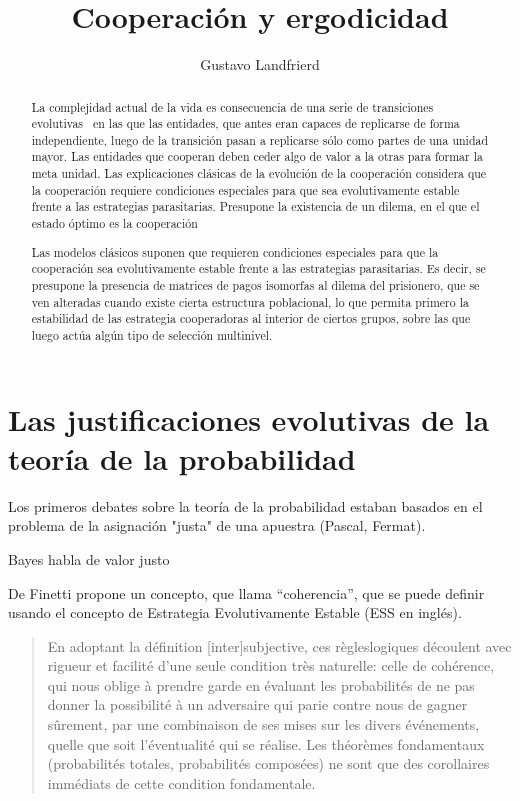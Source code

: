 \documentclass[a4paper,10pt]{article}
\title{Cooperación y ergodicidad}
\author{Gustavo Landfrierd}
\begin{document}
\maketitle

\begin{abstract}

La complejidad actual de la vida es consecuencia de una serie de transiciones evolutivas~\cite{maynardSmith1995-majorTransitions} en las que las entidades, que antes eran capaces de replicarse de forma independiente, luego de la transición pasan a replicarse sólo como partes de una unidad mayor.
Las entidades que cooperan deben ceder algo de valor a la otras para formar la meta unidad.
Las explicaciones clásicas de la evolución de la cooperación considera que la cooperación requiere condiciones especiales para que sea evolutivamente estable frente a las estrategias parasitarias.
Presupone la existencia de un dilema, en el que el estado óptimo es la cooperación


Las modelos clásicos suponen que 
requieren condiciones especiales para que la cooperación sea evolutivamente estable frente a las estrategias parasitarias.
Es decir, se presupone la presencia de matrices de pagos isomorfas al dilema del prisionero, que se ven alteradas cuando existe cierta estructura poblacional, lo que permita primero la estabilidad de las estrategia cooperadoras al interior de ciertos grupos, sobre las que luego actúa algún tipo de selección multinivel.


\end{abstract}

\section{Las justificaciones evolutivas de la teoría de la probabilidad}

Los primeros debates sobre la teoría de la probabilidad estaban basados en el problema de la asignación "justa" de una apuestra (Pascal, Fermat).

Bayes habla de valor justo



De Finetti propone un concepto, que llama ``coherencia'', que se puede definir usando el concepto de Estrategia Evolutivamente Estable (ESS en inglés).

\begin{quotation}
En adoptant la définition [inter]subjective, ces règleslogiques découlent avec rigueur et facilité d’une seule condition très naturelle: celle de cohérence, qui nous oblige à prendre garde en évaluant les probabilités de ne pas donner la possibilité à un adversaire qui parie contre nous de gagner sûrement, par une  combinaison de ses mises sur les divers événements, quelle que soit l’éventualité qui se réalise.
Les théorèmes fondamentaux (probabilités totales, probabilités composées) ne sont que des corollaires immédiats de cette condition fondamentale.
\end{quotation}
\end{document}
